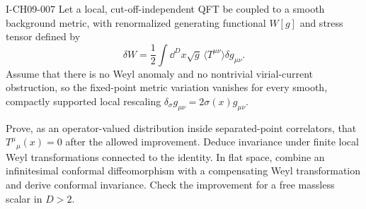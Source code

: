 \begin{exercise}{I-CH09-007}
Let a local, cut-off-independent QFT be coupled to a smooth background metric,
with renormalized generating functional $W[g]$ and stress tensor defined by
\[
  \delta W=\frac12\int\dd^D x\sqrt g\,
  \langle T^{\mu\nu}\rangle\delta g_{\mu\nu}.
\]
Assume that there is no Weyl anomaly and no nontrivial virial-current
obstruction, so the fixed-point metric variation vanishes for every smooth,
compactly supported local rescaling
$\delta_\sigma g_{\mu\nu}=2\sigma(x)g_{\mu\nu}$.

Prove, as an operator-valued distribution inside separated-point correlators,
that $T^\mu{}_{\mu}(x)=0$ after the allowed improvement.  Deduce invariance
under finite local Weyl transformations connected to the identity.  In flat
space, combine an infinitesimal conformal diffeomorphism with a compensating
Weyl transformation and derive conformal invariance.  Check the improvement
for a free massless scalar in $D>2$.
\end{exercise}
